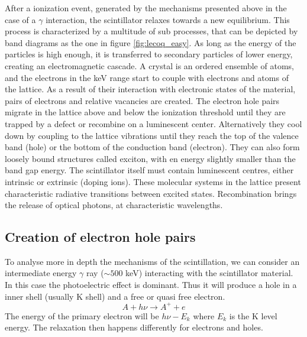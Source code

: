 After a ionization event, generated by the mechanisms presented above in the case of a $\gamma$ interaction, the scintillator relaxes towards a new equilibrium. This process is characterized by a multitude of sub processes, that can be depicted by band diagrams as the one in figure \ref{fig:lecoq_easy}.
As long as the energy of the particles is high enough, it is transferred to secondary particles of lower energy, creating an electromagnetic cascade.
A crystal is an ordered ensemble of atoms, and the electrons in the keV range start to couple with electrons and atoms of the lattice. As a result of their interaction with electronic states of the material, pairs of electrons and relative vacancies are created. The electron hole pairs migrate in the lattice above and below the ionization threshold until they are trapped by a defect or recombine on a luminescent center. Alternatively they cool down by coupling to the lattice vibrations until they reach the top of the valence band (hole) or the bottom of the conduction band (electron). They can also form loosely bound structures called exciton, with en energy slightly smaller than the band gap energy.
The scintillator itself must contain luminescent centres, either intrinsic or extrinsic (doping ions). These molecular systems in the lattice present characteristic radiative transitions between excited states.
Recombination brings the release of optical photons, at characteristic wavelengths.
%
%

\subsection{Creation of electron hole pairs}

To analyse more in depth the mechanisms of the scintillation, we can consider an intermediate energy $\gamma$ ray ($\sim 500$ keV) interacting with the scintillator material. In this case the photoelectric effect is dominant. Thus it will produce a hole in a inner shell (usually K shell) and a free or quasi free electron.
\begin{equation}
A + h\nu \rightarrow A^{+} + e
\end{equation}
The energy of the primary electron will be $h\nu - E_{k}$ where $E_{k}$ is the K level energy. The relaxation then happens differently for electrons and holes. 

